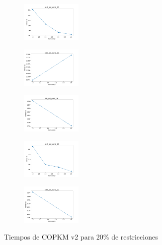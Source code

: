 \begin{figure}[H]
\begin{subfigure}
    \end{subfigure}
    \hfill
    \begin{subfigure}
        \centering
        \includegraphics[width=0.32\textwidth]{img/copkm2/ecoli_set_const_20_49258669_time.png}
    \end{subfigure}
    \hfill
    \begin{subfigure}
        \centering
        \includegraphics[width=0.32\textwidth]{img/copkm2/rand_set_const_20_49258669_time.png}
    \end{subfigure}
    \hfill
    \begin{subfigure}
        \centering
        \includegraphics[width=0.32\textwidth]{img/copkm2/iris_set_const_20_3773969821_time.png}
    \end{subfigure}
    \hfill
    \begin{subfigure}
        \centering
        \includegraphics[width=0.32\textwidth]{img/copkm2/ecoli_set_const_20_3773969821_time.png}
    \end{subfigure}
    \hfill
    \begin{subfigure}
        \centering
        \includegraphics[width=0.32\textwidth]{img/copkm2/rand_set_const_20_3773969821_time.png}
    \end{subfigure}
    \caption{Tiempos de COPKM v2 para 20\% de restricciones}
\end{figure}

